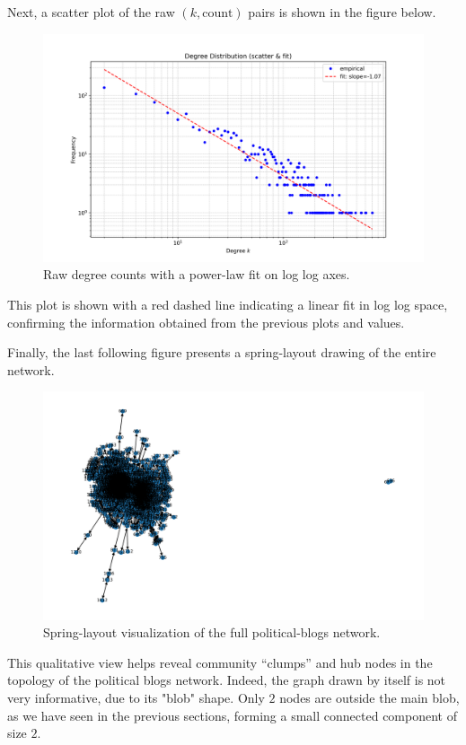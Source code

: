 \documentclass{article}
\begin{document}
Next, a scatter plot of the raw \((k,\text{count})\) pairs is shown in the figure below.
\begin{figure}[H]
  \centering
  \includegraphics[width=1\textwidth]{../images/degree_scatter_fit.png}
  \caption{\label{fig:degree-scatter-fit}Raw degree counts with a power-law fit on log log axes.}
\end{figure}
This plot is shown with a red dashed line indicating a linear fit in log log space, confirming the information obtained from the previous plots and values.

Finally, the last following figure presents a spring-layout drawing of the entire network. 
\begin{figure}[H]
  \centering
  \includegraphics[width=1\textwidth]{../images/polblogs_graph.png}
  \caption{Spring-layout visualization of the full political-blogs network.}
  \label{fig:polblogs-graph}
\end{figure}
This qualitative view helps reveal community “clumps” and hub nodes in the topology of the political blogs network. Indeed, the graph drawn by itself is not very informative, due to its "blob" shape. Only $2$ nodes are outside the main blob, as we have seen in the previous sections, forming a small connected component of size $2$.
\end{document}
